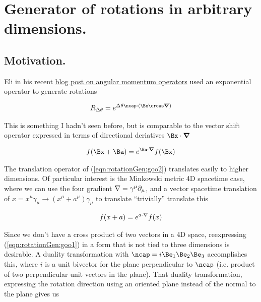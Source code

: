 

\chapter{Generator of rotations in arbitrary dimensions.}
\label{chap:rotationGenerator}
{}
\date{Aug 31, 2009}

\beginArtNoToc

\section{Motivation.}

Eli in his recent \href{http://behindtheguesses.blogspot.com/2009/08/noncommuting-rotation-and-angular.html}{blog post on angular momentum operators} used an exponential operator to generate rotations

\begin{align}\label{eqn:rotationGen:goo1}
R_{\Delta\theta} = e^{\Delta\theta \ncap \cdot (\Bx \cross \spacegrad)}
\end{align}

This is something I hadn't seen before, but is comparable to the vector shift operator expressed in terms of directional deriatives $\Bx \cdot \spacegrad$

\begin{align}\label{eqn:rotationGen:goo2}
f(\Bx + \Ba) = e^{\Ba \cdot \spacegrad} f(\Bx)
\end{align}

The translation operator of (\ref{eqn:rotationGen:goo2}) translates easily to higher dimensions.  Of particular interest is the Minkowski metric 4D spacetime case, where we can use the four gradient $\nabla = \gamma^\mu \partial_\mu$, and a vector spacetime translation of $x = x^\mu \gamma_\mu \rightarrow (x^\mu + a^\mu) \gamma_\mu$ to translate ``trivially'' translate this

\begin{align}\label{eqn:rotationGen:goo3}
f(x + a) = e^{a \cdot \nabla} f(x)
\end{align}

Since we don't have a cross product of two vectors in a 4D space, reexpressing (\ref{eqn:rotationGen:goo1}) in a form that is not tied to three dimensions is desirable.  A duality transformation with $\ncap = i \Be_1 \Be_2 \Be_3$ accomplishes this, where $i$ is a unit bivector for the plane perpendicular to $\ncap$ (i.e. product of two perpendicular unit vectors in the plane).  That duality transformation, expressing the rotation direction using an oriented plane instead of the normal to the plane gives us

